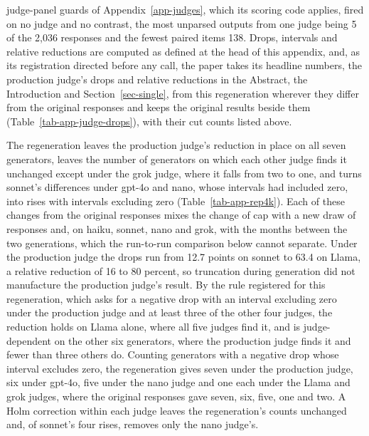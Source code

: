judge-panel guards of Appendix~\ref{app-judges}, which its scoring code
applies, fired on no judge and no contrast, the most unparsed outputs from
one judge being 5 of the 2,036 responses and the fewest paired items 138.
Drops, intervals and relative reductions are computed as defined at the head
of this appendix, and, as its registration directed before any call, the
paper takes its headline numbers, the production judge's drops and relative
reductions in the Abstract, the Introduction and Section~\ref{sec-single},
from this regeneration wherever they differ from the original responses and
keeps the original results beside them (Table~\ref{tab-app-judge-drops}),
with their cut counts listed above.

The regeneration leaves the production judge's
reduction in place on all seven generators, leaves the
number of generators on which each other judge finds it unchanged except under
the grok judge, where it falls from two to one, and turns sonnet's differences
under gpt-4o and nano, whose intervals had included zero, into rises with
intervals excluding zero (Table~\ref{tab-app-rep4k}).
Each of these changes from the original responses mixes the change of cap
with a new draw of responses and, on haiku, sonnet, nano and grok, with the
months between the two generations, which the run-to-run comparison below
cannot separate.
Under the
production judge the drops run from 12.7 points on sonnet to 63.4 on Llama,
a relative reduction of 16 to 80 percent, so truncation during generation did not
manufacture the production judge's result.
By the rule registered for this regeneration, which asks for a negative drop
with an interval excluding zero under the production judge and at least three
of the other four judges, the reduction holds on Llama alone, where all five
judges find it, and is judge-dependent on the other six generators, where the
production judge finds it and fewer than three others do.
Counting generators with a negative drop whose interval excludes zero, the
regeneration gives seven under the production judge, six under gpt-4o, five
under the nano judge and one each under the Llama and grok judges, where the
original responses gave seven, six, five, one and two.
A Holm correction within each judge leaves the regeneration's counts unchanged
and, of sonnet's four rises, removes only the nano judge's.

